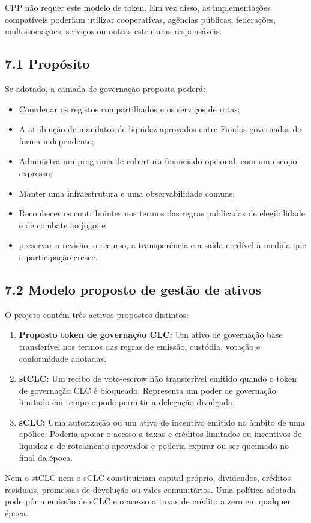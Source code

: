 \documentclass[11pt]{article}
\begin{document}
CPP não requer este modelo de token. Em vez disso, as implementações compatíveis poderiam utilizar cooperativas, agências públicas, federações, multissociações, serviços ou outras estruturas responsáveis.

\subsection*{7.1 Propósito}

Se adotado, a camada de governação proposta poderá:

\begin{itemize}[leftmargin=*]
\item Coordenar os registos compartilhados e os serviços de rotas;
\item A atribuição de mandatos de liquidez aprovados entre Fundos governados de forma independente;
\item Administra um programa de cobertura financiado opcional, com um escopo expresso;
\item Manter uma infraestrutura e uma observabilidade comuns;
\item Reconhecer os contribuintes nos termos das regras publicadas de elegibilidade e de combate ao jogo; e
\item preservar a revisão, o recurso, a transparência e a saída credível à medida que a participação cresce.
\end{itemize}
\subsection*{7.2 Modelo proposto de gestão de ativos}

O projeto contém três activos propostos distintos:

\begin{enumerate}[leftmargin=*]
\item \textbf{Proposto token de governação CLC:} Um ativo de governação base transferível nos termos das regras de emissão, custódia, votação e conformidade adotadas.
\item \textbf{stCLC:} Um recibo de voto-escrow não transferível emitido quando o token de governação CLC é bloqueado. Representa um poder de governação limitado em tempo e pode permitir a delegação divulgada.
\item \textbf{sCLC:} Uma autorização ou um ativo de incentivo emitido no âmbito de uma apólice. Poderia apoiar o acesso a taxas e créditos limitados ou incentivos de liquidez e de roteamento aprovados e poderia expirar ou ser queimado no final da época.
\end{enumerate}
Nem o stCLC nem o sCLC constituiriam capital próprio, dividendos, créditos residuais, promessas de devolução ou vales comunitários. Uma política adotada pode pôr a emissão de sCLC e o acesso a taxas de crédito a zero em qualquer época.
\end{document}

